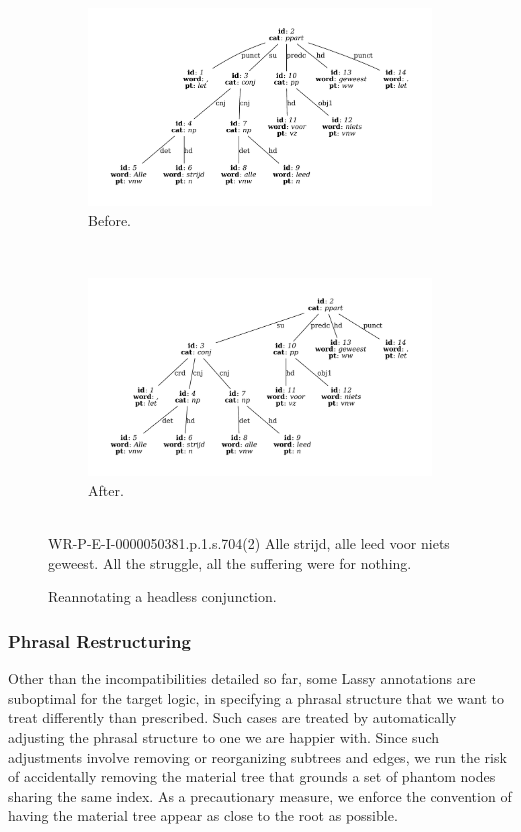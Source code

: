 \begin{figure}
	\centering
	\begin{subfigure}[b]{0.85\textwidth}
		\includegraphics[width=1\textwidth,trim={1.5cm 1.5cm 1.5cm 1.5cm}]{./prebuilt/p2crd_before.pdf}
		\caption{Before.}
	\end{subfigure}\\[\midsep]
	\begin{subfigure}[b]{0.85\textwidth}
			\includegraphics[width=1\textwidth,trim={1.5cm 1.5cm 1.5cm 1.5cm}]{./prebuilt/p2crd_after.pdf}
			\caption{After.}			
	\end{subfigure}\\[\smallsep]
	\lassycap
		{WR-P-E-I-0000050381.p.1.s.704(2)}
		{Alle strijd, alle leed voor niets geweest.}
		{All the struggle, all the suffering were for nothing.}
	\caption{Reannotating a headless conjunction.}
	\label{figure:p2crd}
\end{figure}

\subsubsection{Phrasal Restructuring}
Other than the incompatibilities detailed so far, some Lassy annotations are suboptimal for the target logic, in specifying a phrasal structure that we want to treat differently than prescribed.
Such cases are treated by automatically adjusting the phrasal structure to one we are happier with.
Since such adjustments involve removing or reorganizing subtrees and edges, we run the risk of accidentally removing the material tree that grounds a set of phantom nodes sharing the same index.
As a precautionary measure, we enforce the convention of having the material tree appear as close to the root as possible.

